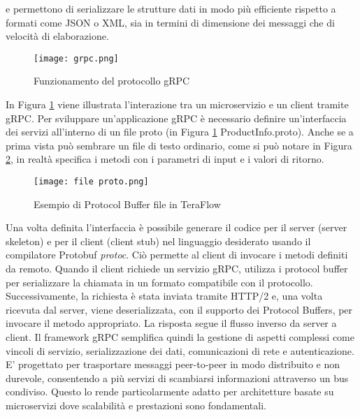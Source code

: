 e permettono di serializzare le strutture dati in modo più efficiente rispetto a formati come JSON o XML, sia in termini di dimensione dei messaggi che di velocità di elaborazione.
\begin{figure}[h]
    \centering
   \texttt{[image: grpc.png]}
    \caption{Funzionamento del protocollo gRPC \cite{librogrpc}}
    \label{fig:grpc}
\end{figure}
In Figura \ref{fig:grpc} viene illustrata l'interazione tra un microservizio e un client tramite gRPC.
\newline Per sviluppare un'applicazione gRPC è necessario definire un'interfaccia dei servizi %
all'interno di un file proto (in Figura \ref{fig:grpc} ProductInfo.proto).
Anche se a prima vista può sembrare un file di testo ordinario, come si può notare in Figura \ref{fig:proto}, in realtà specifica i metodi con i parametri di input e i valori di ritorno.
\begin{figure}[h]
    \centering
   \texttt{[image: file proto.png]}
    \caption{Esempio di Protocol Buffer file in TeraFlow \cite{ProtoBuf}}
    \label{fig:proto}
\end{figure}
\newline Una volta definita l'interfaccia è possibile generare il codice per il server (server skeleton) e per il client (client stub) nel linguaggio desiderato usando il compilatore Protobuf \textit{protoc}\cite{librogrpc}.
Ciò permette al client di invocare i metodi definiti da remoto.
\newline Quando il client richiede un servizio gRPC, utilizza i protocol buffer per serializzare la chiamata in un formato compatibile con il protocollo. 
Successivamente, la richiesta è stata inviata tramite HTTP/2 e, una volta ricevuta dal server, viene deserializzata, con il supporto dei Protocol Buffers, per invocare il metodo appropriato.
La risposta segue il flusso inverso da server a client\cite{librogrpc}.
\newline Il framework gRPC semplifica quindi la gestione di aspetti complessi come vincoli di servizio, serializzazione dei dati, comunicazioni di rete e autenticazione.
E' progettato per trasportare messaggi peer-to-peer in modo distribuito e non durevole, consentendo a più servizi di scambiarsi informazioni attraverso un bus condiviso.
Questo lo rende particolarmente adatto per architetture basate su microservizi dove scalabilità e prestazioni sono fondamentali.
